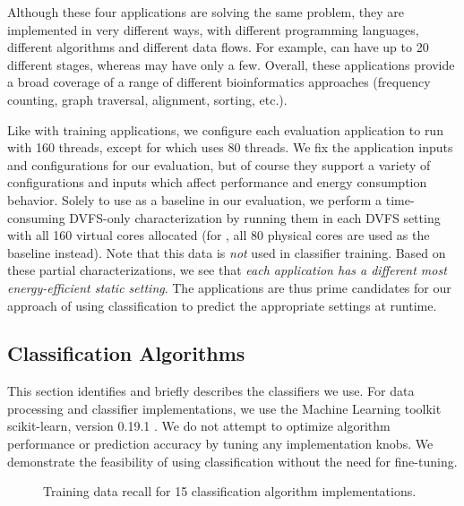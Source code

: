 Although these four applications are solving the same problem, they are implemented in very different ways, with different programming languages, different algorithms and different data flows.
For example,  can have up to 20 different stages, whereas  may have only a few.
Overall, these applications provide a broad coverage of a range of different bioinformatics approaches (frequency counting, graph traversal, alignment, sorting, etc.).

Like with training applications, we configure each evaluation application to run with 160 threads, except for  which uses 80 threads.
We fix the application inputs and configurations for our evaluation, but of course they support a variety of configurations and inputs which affect performance and energy consumption behavior.
Solely to use as a baseline in our evaluation, we perform a time-consuming DVFS-only characterization by running them in each DVFS setting with all 160 virtual cores allocated (for , all 80 physical cores are used as the baseline instead).
Note that this data is \emph{not} used in classifier training.
Based on these partial characterizations, we see that \emph{each application has a different most energy-efficient static setting}.
The applications are thus prime candidates for our approach of using classification to predict the appropriate settings at runtime.


\subsection{Classification Algorithms}

This section identifies and briefly describes the classifiers we use.
For data processing and classifier implementations, we use the Machine Learning toolkit scikit-learn, version 0.19.1 \cite{scikit-learn}.
We do not attempt to optimize algorithm performance or prediction accuracy by tuning any implementation knobs.
We demonstrate the feasibility of using classification without the need for fine-tuning.

\begin{figure}[t]
  \begin{centering}
    
    \caption{Training data recall for 15 classification algorithm implementations.}
    \label{fig:recall}
  \end{centering}
\end{figure}

